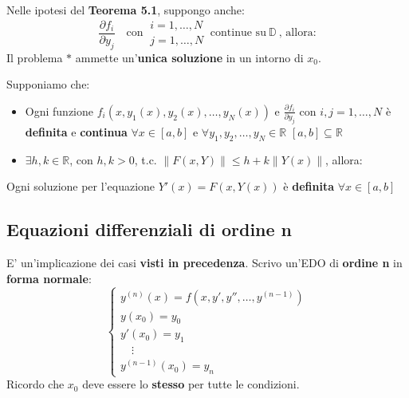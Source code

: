 \documentclass[a4paper, oneside]{article}
\newcommand\R{\mathbb{R}}
\newcommand\D{\mathbb{D}}
\newcommand\de{\partial}
\begin{document}
    \begin{theorem}
        Nelle ipotesi del \textbf{Teorema 5.1}, suppongo anche:
        \[\frac{\de f_i}{\de y_j} \quad\text{con} \ \begin{matrix}
            i=1,\dots,N\\
            j=1,\dots,N
        \end{matrix} \ \text{continue su} \ \D \ \text{, allora:}\]
        Il problema \textcircled{$*$} ammette un'\textbf{unica soluzione} in un intorno di $x_0$. 
    \end{theorem}

    \begin{theorem}
        Supponiamo che:
        \begin{itemize}
            \item Ogni funzione $f_i \left(x,y_1(x),y_2(x),\dots,y_N(x)\right)$ e $\frac{\de f_i}{\de y_j}$
            con $i,j=1,\dots,N$ è \textbf{definita} e \textbf{continua} $\forall x\in[a,b]$ e $\forall y_1,y_2,\dots,y_N\in\R$
            $[a,b]\subseteq\R$
            \item $\exists h,k\in\R$, con $h,k>0$, t.c. $\left\lVert F(x,Y)\right\rVert  \leq h+k \left\lVert Y(x)\right\rVert$, allora:
        \end{itemize}
        Ogni soluzione per l'equazione $Y'(x) = F(x,Y(x))$ è \textbf{definita} $\forall x\in[a,b]$
    \end{theorem}

    \subsection{Equazioni differenziali di ordine n}
    E' un'implicazione dei casi \textbf{visti in precedenza}. Scrivo un'EDO di \textbf{ordine n} in \textbf{forma normale}:
    \[\begin{cases}
        y^{(n)}(x) = f\left(x,y',y'',\dots,y^{(n-1)}\right) \\
        y(x_0) = y_0 \\
        y'(x_0) = y_1 \\
        \quad\vdots \\
        y^{(n-1)}(x_0) = y_n
    \end{cases}\]
    Ricordo che $x_0$ deve essere lo \textbf{stesso} per tutte le condizioni. \\
    
\end{document}
